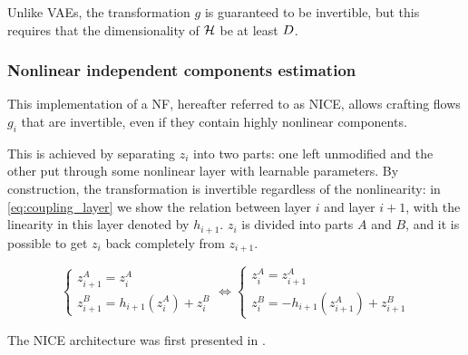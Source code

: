 \documentclass[../main.tex]{subfiles}
\begin{document}
Unlike VAEs, the transformation $g$ is guaranteed to be invertible, but this requires that the dimensionality of $\mathcal{H}$ be at least $D$.

\subsubsection{Nonlinear independent components estimation}

This implementation of a NF, hereafter referred to as NICE, allows crafting flows $g_i$ that are invertible, even if they contain highly nonlinear components.

This is achieved by separating $z_i$ into two parts: one left unmodified and the other put through some nonlinear layer with learnable parameters.
By construction, the transformation is invertible regardless of the nonlinearity: in \autoref{eq:coupling_layer} we show the relation between layer $i$ and layer $i+1$, with the linearity in this layer denoted by $h_{i+1}$. $z_i$ is divided into parts $A$ and $B$, and it is possible to get $z_i$ back completely from $z_{i+1}$.

\begin{equation}
    \label{eq:coupling_layer}
    \begin{cases}
        z_{i+1}^A = z_i^A \\
        z_{i+1}^B = h_{i+1}(z_i^A) + z_i^B
    \end{cases}
    \Leftrightarrow
    \begin{cases}
        z_i^A = z_{i+1}^A \\
        z_i^B = -h_{i+1}(z_{i+1}^A) + z_{i+1}^B
    \end{cases}
\end{equation}

The NICE architecture was first presented in \cite{dinhNICE2015}.
\end{document}
